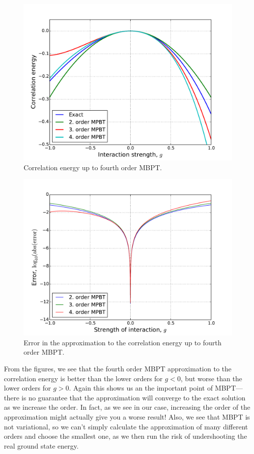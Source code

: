 \documentclass[a4paper, 11pt, notitlepage, english]{article}
\begin{document}
\begin{figure}[p]
\centering
\includegraphics[width=\textwidth]{pert_2.pdf}
\caption{Correlation energy up to fourth order MBPT.}
\end{figure}

\begin{figure}[p]
\centering
\includegraphics[width=\textwidth]{logerror.pdf}
\caption{Error in the approximation to the correlation energy up to fourth order MBPT.}
\end{figure}

\clearpage

From the figures, we see that the fourth order MBPT approximation to the correlation energy is better than the lower orders for $g<0$, but worse than the lower orders for $g>0$. Again this shows us an the important point of MBPT---there is no guarantee that the approximation will converge to the exact solution as we increase the order. In fact, as we see in our case, increasing the order of the approximation might actually give you a worse result! Also, we see that MBPT is not variational, so we can't simply calculate the approximation of many different orders and choose the smallest one, as we then run the risk of undershooting the real ground state energy.
\end{document}
